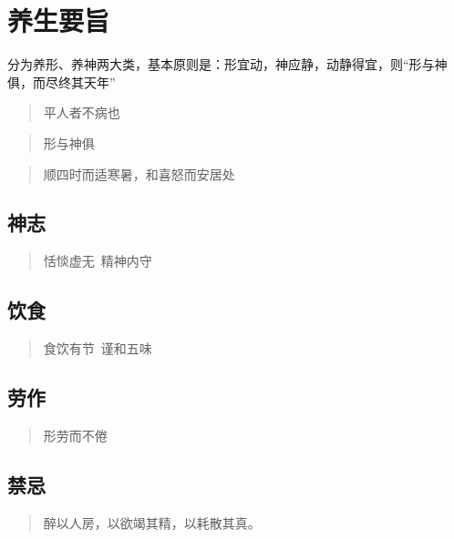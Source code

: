 \chapter{养生要旨}

分为养形、养神两大类，基本原则是：形宜动，神应静，动静得宜，则“形与神俱，而尽终其天年”

\begin{quote}
  平人者不病也
\end{quote}
\begin{quote}
  形与神俱
\end{quote}
\begin{quote}
  顺四时而适寒暑，和喜怒而安居处
\end{quote}

\section{神志}
\begin{quote}
  恬惔虚无\ 精神内守
\end{quote}

\section{饮食}
\begin{quote}
  食饮有节\ 谨和五味
\end{quote}

\section{劳作}
\begin{quote}
  形劳而不倦
\end{quote}

\section{禁忌}
\begin{quote}
  醉以人房，以欲竭其精，以耗散其真。
\end{quote}
